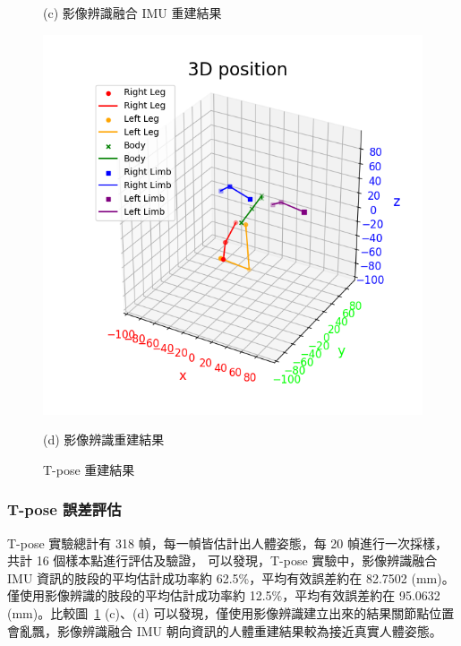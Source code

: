 \begin{figure}[!ht]
\begin{minipage}{.5\textwidth}
      \caption*{(c) 影像辨識融合 IMU 重建結果}
   \end{minipage}%
   \begin{minipage}{.5\textwidth}
      \centering
      \includegraphics[width=.95\linewidth]{figure/ch4_fig_tpose_result_no2.png}
      \caption*{(d) 影像辨識重建結果}
   \end{minipage}
   \caption[T-pose 重建結果]{T-pose 重建結果}
   \label{ch4_fig_Tpose}
\end{figure}

\subsubsection*{T-pose 誤差評估}
T-pose 實驗總計有 318 幀，每一幀皆估計出人體姿態，每 20 幀進行一次採樣，共計 16 個樣本點進行評估及驗證，
可以發現，T-pose 實驗中，影像辨識融合 IMU 資訊的肢段的平均估計成功率約 62.5\%，平均有效誤差約在 82.7502 (mm)。僅使用影像辨識的肢段的平均估計成功率約 12.5\%，平均有效誤差約在 95.0632 (mm)。比較圖~\ref{ch4_fig_Tpose} (c)、(d) 可以發現，僅使用影像辨識建立出來的結果關節點位置會亂飄，影像辨識融合 IMU 朝向資訊的人體重建結果較為接近真實人體姿態。

